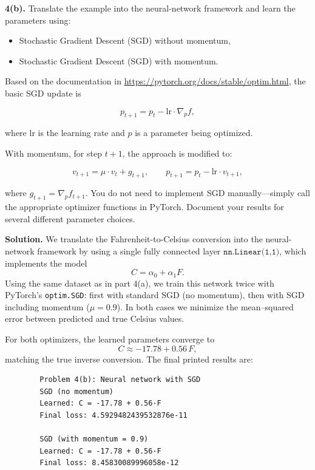 \documentclass[11pt]{article}
\begin{document}
	\vspace{0.5em}
	\noindent\textbf{4(b).} Translate the example into the neural-network framework and
	learn the parameters using:
	
	\begin{itemize}
		\item Stochastic Gradient Descent (SGD) without momentum,
		\item Stochastic Gradient Descent (SGD) with momentum.
	\end{itemize}
	
	Based on the documentation in \url{https://pytorch.org/docs/stable/optim.html}, 
	the basic SGD update is
	
	\[
	p_{t+1} = p_{t} - \text{lr} \cdot \nabla_p f,
	\]
	
	where \(\text{lr}\) is the learning rate and \(p\) is a parameter being optimized.
	
	With momentum, for step \(t+1\), the approach is modified to:
	
	\[
	v_{t+1} = \mu \cdot v_t + g_{t+1},
	\qquad
	p_{t+1} = p_t - \text{lr} \cdot v_{t+1},
	\]
	
	where \(g_{t+1} = \nabla_p f_{t+1}\).  
	You do not need to implement SGD manually—simply call the appropriate optimizer
	functions in PyTorch. Document your results for several different parameter choices.
	
	\noindent\textbf{Solution.}
	We translate the Fahrenheit-to-Celsius conversion into the neural-network
	framework by using a single fully connected layer \(\texttt{nn.Linear(1,1)}\),
	which implements the model
	\[
	C = \alpha_0 + \alpha_1 F.
	\]
	Using the same dataset as in part 4(a), we train this network twice with
	PyTorch's \texttt{optim.SGD}: first with standard SGD (no momentum), then with
	SGD including momentum (\(\mu = 0.9\)). In both cases we minimize the
	mean–squared error between predicted and true Celsius values.
	
	For both optimizers, the learned parameters converge to
	\[
	C \approx -17.78 + 0.56\,F,
	\]
	matching the true inverse conversion. The final printed results are:
	
	\begin{verbatim}
		Problem 4(b): Neural network with SGD
		SGD (no momentum)
		Learned: C = -17.78 + 0.56·F
		Final loss: 4.5929482439532876e-11
		
		SGD (with momentum = 0.9)
		Learned: C = -17.78 + 0.56·F
		Final loss: 8.45830089996058e-12
	\end{verbatim}
	
\end{document}
